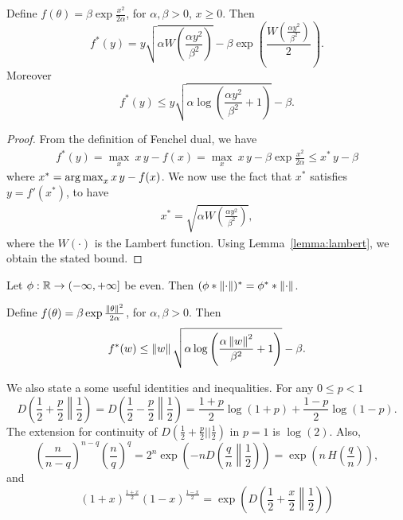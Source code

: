 \begin{lemma}
Define $f(\theta)= \beta \exp\frac{x^2}{2 \alpha}$, for $\alpha,\beta>0$, $x\geq0$. Then
\[
f^*(y)=y \sqrt{\alpha W\left(\frac{\alpha y^2}{\beta^2}\right)} - \beta \exp\left(\frac{W\left(\frac{\alpha y^2}{\beta^2}\right)}{2}\right).
\]
Moreover
\[
f^*(y) \leq y \sqrt{\alpha \log \left(\frac{\alpha y^2}{\beta^2} +1 \right)} - \beta.
\]
\end{lemma}
\begin{proof}
From the definition of Fenchel dual, we have
\begin{align*}
f^*(y)= \max_{x} \  x\, y - f(x) = \max_{x} \  x\, y - \beta \exp\frac{x^2}{2 \alpha} \leq x^*\,y -\beta
\end{align*}
where $x^*= \operatorname*{arg\,max}_{x} x\, y - f(x)$. We now use the fact that $x^*$ satisfies $y = f'(x^*)$, to have
\begin{align*}
x^*=\sqrt{\alpha W\left(\frac{\alpha y^2}{\beta^2}\right)},
\end{align*}
where the $W(\cdot)$ is the Lambert function.
Using Lemma~\ref{lemma:lambert}, we obtain the stated bound.
\end{proof}

\begin{lemma}
Let $\phi:\mathbb{R} \rightarrow (-\infty, +\infty]$ be even. Then $(\phi \ast \left\|{\cdot}\right\|)^*=\phi^* \ast \left\|{\cdot}\right\|$.
\end{lemma}

\begin{cor}
\label{cor:dual_exp_square}
Define $f(\theta)= \beta \exp\frac{\left\|{\theta}\right\|^2}{2 \alpha}$, for $\alpha,\beta>0$. Then
\[
f^*(w) \leq  \left\|{w}\right\| \sqrt{\alpha \log \left(\frac{\alpha \left\|{w}\right\|^2}{\beta^2} +1 \right)} - \beta.
\]
\end{cor}

We also state a some useful identities and inequalities.
For any $ 0\leq p < 1$
\[
D\left(\frac{1}{2}+\frac{p}{2}\middle\|\frac{1}{2}\right) = D\left(\frac{1}{2}-\frac{p}{2}\middle\|\frac{1}{2}\right)= \frac{1+p}{2} \log(1+p) + \frac{1-p}{2} \log(1-p).
\]
The extension for continuity of $D(\frac{1}{2}+\frac{p}{2}||\frac{1}{2})$ in $p=1$ is $\log(2)$.
Also,
\[
\left(\frac{n}{n-q}\right)^{n-q} \left(\frac{n}{q}\right)^{q} = 2^n \exp\left(-n D\left(\frac{q}{n}\middle\|\frac{1}{2}\right)\right)=\exp\left(n\, H\left(\frac{q}{n}\right)\right),
\]
and
\begin{equation}
\label{eq:div_2}
\left(1+x\right)^\frac{1+x}{2} \left(1-x\right)^\frac{1-x}{2}= \exp\left( D\left(\frac{1}{2}+\frac{x}{2}\middle\|\frac{1}{2}\right) \right)
\end{equation}

